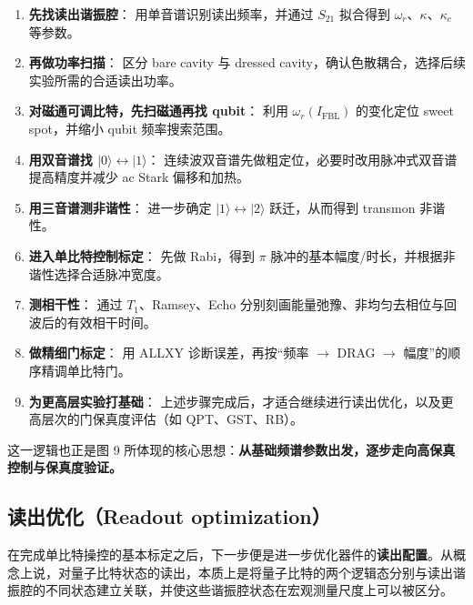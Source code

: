 \documentclass[12pt,a4paper,oneside]{ctexbook}
\begin{document}
\begin{enumerate}
    \item \textbf{先找读出谐振腔}：
    用单音谱识别读出频率，并通过 \(S_{21}\) 拟合得到 \(\omega_r\)、\(\kappa\)、\(\kappa_c\) 等参数。

    \item \textbf{再做功率扫描}：
    区分 bare cavity 与 dressed cavity，确认色散耦合，选择后续实验所需的合适读出功率。

    \item \textbf{对磁通可调比特，先扫磁通再找 qubit}：
    利用 \(\omega_r(I_{\mathrm{FBL}})\) 的变化定位 sweet spot，并缩小 qubit 频率搜索范围。

    \item \textbf{用双音谱找 \(|0\rangle \leftrightarrow |1\rangle\)}：
    连续波双音谱先做粗定位，必要时改用脉冲式双音谱提高精度并减少 ac Stark 偏移和加热。

    \item \textbf{用三音谱测非谐性}：
    进一步确定 \(|1\rangle \leftrightarrow |2\rangle\) 跃迁，从而得到 transmon 非谐性。

    \item \textbf{进入单比特控制标定}：
    先做 Rabi，得到 \(\pi\) 脉冲的基本幅度/时长，并根据非谐性选择合适脉冲宽度。

    \item \textbf{测相干性}：
    通过 \(T_1\)、Ramsey、Echo 分别刻画能量弛豫、非均匀去相位与回波后的有效相干时间。

    \item \textbf{做精细门标定}：
    用 ALLXY 诊断误差，再按“频率 \(\rightarrow\) DRAG \(\rightarrow\) 幅度”的顺序精调单比特门。

    \item \textbf{为更高层实验打基础}：
    上述步骤完成后，才适合继续进行读出优化，以及更高层次的门保真度评估（如 QPT、GST、RB）。
\end{enumerate}

这一逻辑也正是图 9 所体现的核心思想：\textbf{从基础频谱参数出发，逐步走向高保真控制与保真度验证。}


\subsection{读出优化（Readout optimization）}

在完成单比特操控的基本标定之后，下一步便是进一步优化器件的\textbf{读出配置}。从概念上说，对量子比特状态的读出，本质上是将量子比特的两个逻辑态分别与读出谐振腔的不同状态建立关联，并使这些谐振腔状态在宏观测量尺度上可以被区分。
\end{document}
